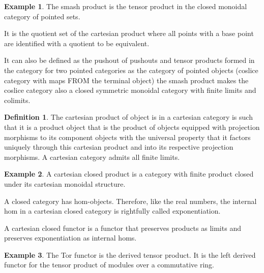 \documentclass[10pt]{article}
\theoremstyle{plain}%
\theoremstyle{definition}
\newtheorem{definition}{Definition}[section]
\newtheorem{example}{Example}[section]
\theoremstyle{remark}
\begin{document}
\begin{example}
	The smash product is the tensor product in the closed monoidal category of pointed sets.

	It is the quotient set of the cartesian product where all points with a base point are identified with a quotient to be equivalent.

	It can also be defined as the pushout of pushouts and tensor products formed in the category for two pointed categories as the category of pointed objects (coslice category with maps FROM the terminal object) the smash product makes the coslice category also a closed symmetric monoidal category with finite limits and colimits.
\end{example}

\begin{definition}
	The cartesian product of object is in a cartesian category is such that it is a product object that is the product of objects equipped with projection morphisms to its component objects with the universal property that it factors uniquely through this cartesian product and into its respective projection morphisms. A cartesian category admits all finite limits.
\end{definition}

\begin{example}
	A cartesian closed product is a category with finite product closed under its cartesian monoidal structure.

	A closed category has hom-objects. Therefore, like the real numbers, the internal hom in a cartesian closed category is rightfully called exponentiation.

	A cartesian closed functor is a functor that preserves products as limits and preserves exponentiation as internal homs.
\end{example}

\begin{example}
	The Tor functor is the derived tensor product. It is the left derived functor for the tensor product of modules over a commutative ring.
\end{example}
\end{document}
